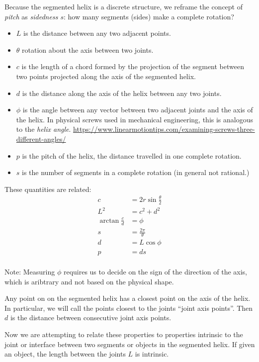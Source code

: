 \documentclass[11pt]{article}
\begin{document}
{Because the segmented helix is a discrete structure, we reframe the concept of {\em pitch} as {\em sidedness $s$}: how many segments (sides)
make a complete rotation?

\begin{itemize}
\item $L$ is the distance between any two adjacent points.
  \item $\theta$ rotation about the axis between two joints.
  \item $c$ is the length of a chord formed by the projection of the segment between two points projected along the axis of the segmented helix.
\item $d$ is the distance along the axis of the helix between any two joints.
\item $\phi$ is the angle between any vector between two adjacent joints and the axis of the helix. In physical screws used in mechanical engineering, this is analogous to the {\em helix angle}. \url{https://www.linearmotiontips.com/examining-screws-three-different-angles/}
  \item $p$ is the pitch of the helix, the distance travelled in one complete rotation.
  \item $s$ is the number of segments in a complete rotation (in general not rational.)
  \end{itemize}
These quantities are related:
\begin{align}
    c &= 2r\sin{\frac{\theta}{2}} \\
    L^2 &= c^2+d^2  \\
    \arctan{\frac{c}{d}}  &= \phi \\
    s &= \frac{2 \pi}{\theta} \\
    d &= L \cos{\phi} \\
    p &= d s \\
\end{align}

Note: Measuring $\phi$ requires us to decide on the sign of the direction of the axis, which is aribtrary and not based on the
physical shape.

Any point on on the segmented helix has a closest point on the axis of the helix. In particular, we will call the points closest to the
joints ``joint axis points''. Then $d$ is the distance between consecutive joint axis points.

Now we are attempting to relate these properties to properties intrinsic to the joint or interface between
two segments or objects in the segmented helix. If given an object, the length between the joints $L$ is intrinsic.

}
\end{document}
